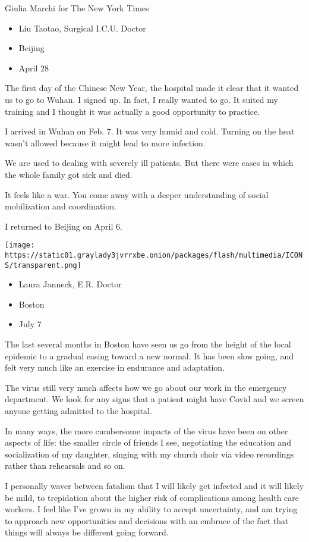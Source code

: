 Giulia Marchi for The New York Times

\begin{itemize}
\tightlist
\item
  Liu Taotao, Surgical I.C.U. Doctor
\item
  Beijing
\item
  April 28
\end{itemize}

The first day of the Chinese New Year, the hospital made it clear that
it wanted us to go to Wuhan. I signed up. In fact, I really wanted to
go. It suited my training and I thought it was actually a good
opportunity to practice.

I arrived in Wuhan on Feb. 7. It was very humid and cold. Turning on the
heat wasn't allowed because it might lead to more infection.

We are used to dealing with severely ill patients. But there were cases
in which the whole family got sick and died.

It feels like a war. You come away with a deeper understanding of social
mobilization and coordination.

I returned to Beijing on April 6.

\texttt{[image: https://static01.graylady3jvrrxbe.onion/packages/flash/multimedia/ICONS/transparent.png]}

\begin{itemize}
\tightlist
\item
  Laura Janneck, E.R. Doctor
\item
  Boston
\item
  July 7
\end{itemize}

The last several months in Boston have seen us go from the height of the
local epidemic to a gradual easing toward a new normal. It has been slow
going, and felt very much like an exercise in endurance and adaptation.

The virus still very much affects how we go about our work in the
emergency department. We look for any signs that a patient might have
Covid and we screen anyone getting admitted to the hospital.

In many ways, the more cumbersome impacts of the virus have been on
other aspects of life: the smaller circle of friends I see, negotiating
the education and socialization of my daughter, singing with my church
choir via video recordings rather than rehearsals and so on.

I personally waver between fatalism that I will likely get infected and
it will likely be mild, to trepidation about the higher risk of
complications among health care workers. I feel like I've grown in my
ability to accept uncertainty, and am trying to approach new
opportunities and decisions with an embrace of the fact that things will
always be different going forward.

